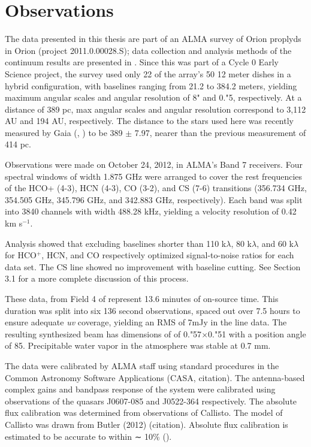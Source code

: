 \chapter{Observations}
\label{chap:observations}

The data presented in this thesis are part of an ALMA survey of Orion proplyds in Orion (project 2011.0.00028.S); data collection and analysis methods of the continuum results are presented in \citet{mann_alma_2014}. Since this was part of a Cycle 0 Early Science project, the survey used only 22 of the array's 50 12 meter dishes in a hybrid configuration, with baselines ranging from 21.2 to 384.2 meters, yielding maximum angular scales and angular resolution of 8" and 0."5, respectively. At a distance of 389 pc, max angular scales and angular resolution correspond to 3,112 AU and 194 AU, respectively. The distance to the stars used here was recently measured by Gaia (\citet{gaia_collaboration_gaia_2016}, \citet{gaia_collaboration_gaia_2018}) to be 389 $\pm$ 7.97, nearer than the previous measurement of 414 pc.
\bigskip

Observations were made on October 24, 2012, in ALMA's Band 7 receivers. Four spectral windows of width 1.875 GHz were arranged to cover the rest frequencies of the HCO+ (4-3), HCN (4-3), CO (3-2), and CS (7-6) transitions (356.734 GHz, 354.505 GHz, 345.796 GHz, and 342.883 GHz, respectively). Each band was split into 3840 channels with width 488.28 kHz, yielding a velocity resolution of 0.42 km s$^{-1}$.

\bigskip


Analysis showed that excluding baselines shorter than 110 k$\lambda$, 80 k$\lambda$, and 60 k$\lambda$ for HCO$^{+}$, HCN, and CO respectively optimized signal-to-noise ratios for each data set. The CS line showed no improvement with baseline cutting. See Section 3.1 for a more complete discussion of this process.


These data, from Field 4 of \citet{mann_alma_2014} represent 13.6 minutes of on-source time. This duration was split into six 136 second observations, spaced out over 7.5 hours to ensure adequate \textit{uv} coverage, yielding an RMS of 7mJy in the line data. The resulting synthesized beam has dimensions of of 0."57$\times$0."51 with a position angle of 85\degree. Precipitable water vapor in the atmosphere was stable at 0.7 mm.


The data were calibrated by ALMA staff using standard procedures in the Common Astronomy Software Applications (CASA, citation). The antenna-based complex gains and bandpass response of the system were calibrated using observations of the quasars J0607-085 and J0522-364 respectively. The absolute flux calibration was determined from observations of Callisto. The model of Callisto was drawn from Butler (2012) (citation). Absolute flux calibration is estimated to be accurate to within ∼ 10\% (\citet{mann_alma_2014}).

